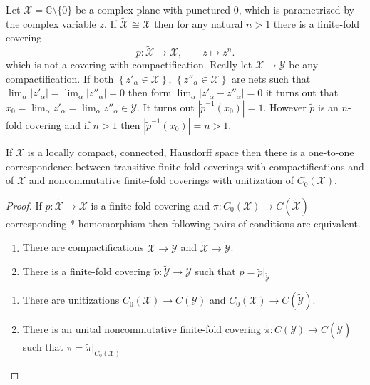 \documentclass{beamer}
\theoremstyle{plain}
\newcommand{\C}{\mathbb{C}}
\newcommand{\al}{\alpha}
\begin{document}
\begin{frame}
\begin{example}
	
	Let $\mathcal X  = \C \setminus \{0\}$ be a complex plane with punctured 0, which is parametrized by the complex variable $z$. 
	If $\widetilde{   \mathcal X } \cong \mathcal X$ then for any natural $n>1$ there is a finite-fold covering 
	\begin{equation*}
	p: \widetilde{   \mathcal X } \to \mathcal X,
	\qquad	z \mapsto z^n.
	\end{equation*}
	which is not a covering with compactification. Really let  $\mathcal X \to\mathcal Y$ be any compactification. If both $\left\{z'_\al \in \mathcal X\right\}$, 	$\left\{z''_\al \in \mathcal X\right\}$ are  nets such that $\lim_{\al}\left|z'_\al\right|=\lim_\al\left|z''_\al\right| = 0$ then form $\lim_{\al}\left|z'_\al-z''_\al\right|= 0$ it turns out that
	$
	x_0 = \lim_{\al} z'_\al = \lim_{\al} z''_\al \in \mathcal Y
	$. 	It turns out $\left|\widetilde{p}^{-1}\left(x_0 \right) \right|=1$. However $\widetilde{p}$ is an $n$-fold covering and if $n >1$ then  $\left|\widetilde{p}^{-1}\left(x_0 \right) \right|=n>1$.
\end{example}
\end{frame}
\begin{frame}
\begin{lemma}
If $\mathcal X$ is a locally compact, connected, Hausdorff space then there is a one-to-one correspondence between transitive finite-fold coverings with compactifications and of $\mathcal X$ and noncommutative finite-fold coverings with unitization of $C_0\left(\mathcal X\right)$.
\end{lemma}
\begin{proof}
	If $p: \widetilde{   \mathcal X }\to  \mathcal X$ is a finite fold covering and $\pi: C_0\left({   \mathcal X }\right)  \to C\left( \widetilde{   \mathcal X }\right)$ corresponding *-homomorphism then
following pairs of conditions are equivalent.
\begin{enumerate}
	\item There are compactifications ${   \mathcal X } \to {   \mathcal Y }$ and $\widetilde{   \mathcal X } \to \widetilde{   \mathcal Y }$.
	\item There is a finite-fold  covering $\widetilde{p}:\widetilde{   \mathcal Y }\to {   \mathcal Y }$ such that $p= \widetilde{p}|_{\widetilde{   \mathcal Y }}$
\end{enumerate}
\begin{enumerate}
	\item There are unitizations $C_0\left( {   \mathcal X } \right) \to C\left(  {   \mathcal Y }\right) $ and $C_0\left({   \mathcal X }\right)  \to C\left( \widetilde{   \mathcal Y }\right) $.
	\item There is an unital noncommutative finite-fold  covering $\widetilde{\pi}:C\left({   \mathcal Y } \right)\to C\left(  \widetilde{   \mathcal Y }\right) $ such that $\pi= \widetilde{\pi}|_{C_0\left( {\mathcal X}\right)  }$
\end{enumerate}

\end{proof}

\end{frame}
\end{document}
